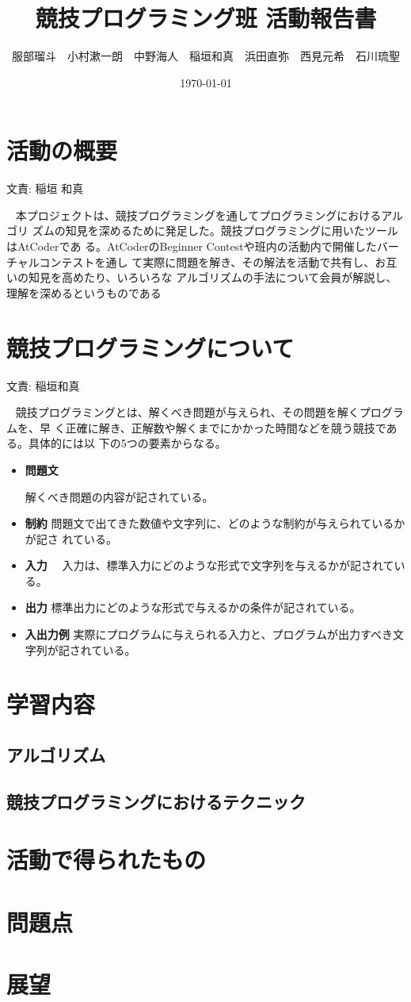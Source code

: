 \documentclass[11pt,a4paper]{jsarticle}
\title{競技プログラミング班 活動報告書}
\author{服部瑠斗　小村漱一朗　中野海人　稲垣和真　浜田直弥　西見元希　石川琉聖}
\date{\today}
\newcommand{\writtenBy}[1]{\begin{flushright}文責: #1\end{flushright}~}
\begin{document}
\maketitle
%
%
\section{活動の概要}
\writtenBy{稲垣 和真}
本プロジェクトは、競技プログラミングを通してプログラミングにおけるアルゴリ
ズムの知見を深めるために発足した。競技プログラミングに用いたツールはAtCoderであ
る。AtCoderのBeginner Contestや班内の活動内で開催したバーチャルコンテストを通し
て実際に問題を解き、その解法を活動で共有し、お互いの知見を高めたり、いろいろな
アルゴリズムの手法について会員が解説し、理解を深めるというものである

\section{競技プログラミングについて}
\writtenBy{稲垣和真}
競技プログラミングとは、解くべき問題が与えられ、その問題を解くプログラムを、早
く正確に解き、正解数や解くまでにかかった時間などを競う競技である。具体的には以
下の5つの要素からなる。
\begin{itemize}
    \item {\bf 問題文}
        \par
        解くべき問題の内容が記されている。
    \item {\bf 制約}
        問題文で出てきた数値や文字列に、どのような制約が与えられているかが記さ
        れている。
    \par
    \item {\bf 入力}
        　入力は、標準入力にどのような形式で文字列を与えるかが記されている。
    \par
    \item {\bf 出力}
        標準出力にどのような形式で与えるかの条件が記されている。
    \par
    \item {\bf 入出力例}
        実際にプログラムに与えられる入力と、プログラムが出力すべき文字列が記されている。
\end{itemize}
\section{学習内容}
\subsection{アルゴリズム}
\subsection{競技プログラミングにおけるテクニック}
\section{活動で得られたもの}
\section{問題点}
\section{展望}


%
%
\end{document}
